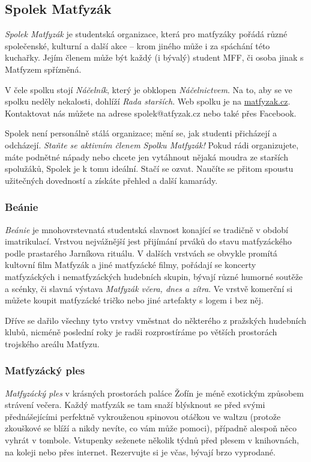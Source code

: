 \subsection{Spolek Matfyzák}


\textit{Spolek Matfyzák} je studentská organizace, která pro matfyzáky pořádá
různé společenské, kulturní a další akce – krom jiného může i za spáchání této
kuchařky. Jejím členem může být každý (i bývalý) student MFF, či osoba jinak s
Matfyzem spřízněná.

V čele spolku stojí \textit{Náčelník}, který je obklopen \textit{Náčelnictvem}.
Na to, aby se ve spolku neděly nekalosti, dohlíží \textit{Rada starších}. Web
spolku je na \url{matfyzak.cz}. Kontaktovat nás můžete na adrese
spolek@atfyzak.cz nebo také přes Facebook.

Spolek není personálně stálá organizace; mění se, jak studenti přicházejí a
odcházejí. \textit{Staňte se aktivním členem Spolku Matfyzák!} Pokud rádi
organizujete, máte podnětné nápady nebo chcete jen vytáhnout nějaká moudra ze
starších spolužáků, Spolek je k tomu ideální. Stačí se ozvat. Naučíte se přitom
spoustu užitečných dovedností a získáte přehled a další kamarády.


\subsubsection{Beánie}
\textit{Beánie} je mnohovrstevnatá studentská slavnost konající se tradičně v
období imatrikulací. Vrstvou nejvážnější jest přijímání prváků do stavu
matfyzáckého podle prastarého Jarníkova rituálu. V dalších vrstvách se obvykle
promítá kultovní film Matfyzák a jiné matfyzácké filmy, pořádají se koncerty
matfyzáckých i nematfyzáckých hudebních skupin, bývají různé humorné soutěže a
scénky, či slavná výstava \textit{Matfyzák včera, dnes a zítra}. Ve vrstvě
komerční si můžete koupit matfyzácké tričko nebo jiné artefakty s logem i bez
něj.

Dříve se dařilo všechny tyto vrstvy vměstnat do některého z pražských hudebních
klubů, nicméně poslední roky je radši rozprostíráme po větších prostorách
trojského areálu Matfyzu.


\subsubsection{Matfyzácký ples}
\textit{Matfyzácký ples} v krásných prostorách paláce Žofín je méně exotickým
způsobem strávení večera. Každý matfyzák se tam snaží blýsknout se před svými
přednášejícími perfektně vykrouženou spinovou otáčkou ve waltzu (protože
zkouškové se blíží a nikdy nevíte, co vám může pomoci), případně alespoň něco
vyhrát v tombole. Vstupenky seženete několik týdnů před plesem v knihovnách, na
koleji nebo přes internet. Rezervujte si je včas, bývají brzo vyprodané.


